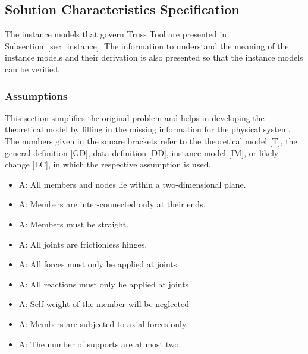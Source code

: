 \documentclass[12pt]{article}
\newcounter{assumpnum} %
\begin{document}
\subsection{Solution Characteristics Specification}
The instance models that govern Truss Tool are presented in
Subsection~\ref{sec_instance}.  The information to understand the meaning of the instance models and their derivation is also presented so that the instance models can be verified.

\subsubsection{Assumptions} \label{sec_assumpt}

This section simplifies the original problem and helps in developing the
theoretical model by filling in the missing information for the physical
system. The numbers given in the square brackets refer to the theoretical model
[T], the general definition [GD], data definition [DD], instance model [IM], or
likely change [LC], in which the respective assumption is used.

\begin{itemize}

\item{A\theassumpnum \label{planar}: All members and nodes lie within a two-dimensional plane.}

\item{A\theassumpnum \label{connection}: Members are inter-connected only at their ends.}
\item{A\theassumpnum \label{as_straight}: Members must be straight.}
\item{A\theassumpnum \label{frictionless}: All joints are frictionless hinges.}
\item{A\theassumpnum \label{Force_at_joints}: All forces must only be applied at joints}
\item{A\theassumpnum \label{reaction_at_joints}: All reactions must only be applied at joints}
\item{A\theassumpnum \label{self_w}: Self-weight of the member will be neglected}
\item{A\theassumpnum \label{axial_fmem}: Members are subjected to axial forces only.}
\item{A\theassumpnum \label{maxsupport}: The number of supports are at most two.}

\end{itemize}
\end{document}
